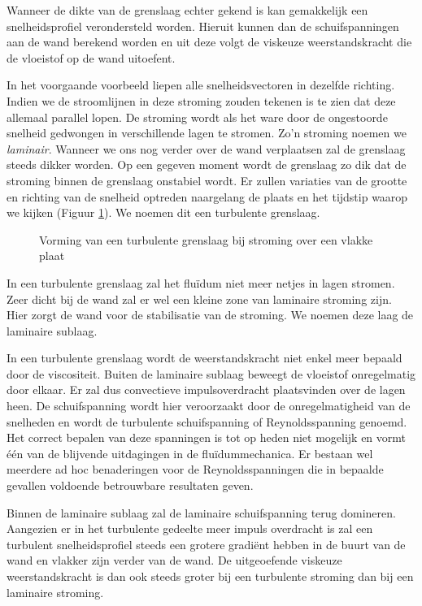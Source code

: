 Wanneer de dikte van de grenslaag echter gekend is kan gemakkelijk een snelheidsprofiel verondersteld worden. Hieruit kunnen dan de schuifspanningen aan de wand berekend worden en uit deze volgt de viskeuze weerstandskracht die de vloeistof op de wand uitoefent.

In het voorgaande voorbeeld liepen alle snelheidsvectoren in dezelfde richting. Indien we de stroomlijnen in deze stroming zouden tekenen is te zien dat deze allemaal parallel lopen. De stroming wordt als het ware door de ongestoorde snelheid gedwongen in verschillende lagen te stromen. Zo'n stroming noemen we \emph{laminair}. Wanneer we ons nog verder over de wand verplaatsen zal de grenslaag steeds dikker worden. Op een gegeven moment wordt de grenslaag zo dik dat de stroming binnen de grenslaag onstabiel wordt. Er zullen variaties van de grootte en richting van de snelheid optreden naargelang de plaats en het tijdstip waarop we kijken (Figuur \ref{fig:Turbulente grenslaag}). We noemen dit een turbulente grenslaag.
\begin{figure}[htb]
	\centering
	
	\caption{Vorming van een turbulente grenslaag bij stroming over een vlakke plaat}
	\label{fig:Turbulente grenslaag}
\end{figure}

In een turbulente grenslaag zal het fluïdum niet meer netjes in lagen stromen. Zeer dicht bij de wand zal er wel een kleine zone van laminaire stroming zijn. Hier zorgt de wand voor de stabilisatie van de stroming. We noemen deze laag de laminaire sublaag.

In een turbulente grenslaag wordt de weerstandskracht niet enkel meer bepaald door de viscositeit. Buiten de laminaire sublaag beweegt de vloeistof onregelmatig door elkaar. Er zal dus convectieve impulsoverdracht plaatsvinden over de lagen heen. De schuifspanning wordt hier veroorzaakt door de onregelmatigheid van de snelheden en wordt de turbulente schuifspanning of Reynoldsspanning genoemd. Het correct bepalen van deze spanningen is tot op heden niet mogelijk en vormt één van de blijvende uitdagingen in de fluïdummechanica. Er bestaan wel meerdere ad hoc benaderingen voor de Reynoldsspanningen die in bepaalde gevallen voldoende betrouwbare resultaten geven.

Binnen de laminaire sublaag zal de laminaire schuifspanning terug domineren. Aangezien er in het turbulente gedeelte meer impuls overdracht is zal een turbulent snelheidsprofiel steeds een grotere gradiënt hebben in de buurt van de wand en vlakker zijn verder van de wand. De uitgeoefende viskeuze weerstandskracht is dan ook steeds groter bij een turbulente stroming dan bij een laminaire stroming.


